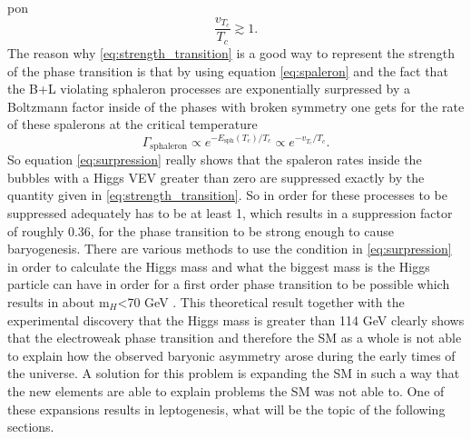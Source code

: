 pon\begin{equation}
	\frac{v_{T_c}}{T_c}\gtrsim1.
	\label{eq:strength_transition}
\end{equation}
The reason why \eqref{eq:strength_transition} is a good way to represent the strength of the phase transition is that by using equation \eqref{eq:spaleron} and the fact that the B+L violating sphaleron processes are exponentially surpressed by a Boltzmann factor inside of the phases with broken symmetry one gets for the rate of these spalerons at the critical temperature
\begin{equation}
	\Gamma_\text{sphaleron}\propto e^{-E_\text{sph}(T_c)/T_c}\propto e^{-v_{T_c}/T_c}.
	\label{eq:surpression}
\end{equation}
So equation \eqref{eq:surpression} really shows that the spaleron rates inside the bubbles with a Higgs VEV greater than zero are suppressed exactly by the quantity given in \eqref{eq:strength_transition}. So in order for these processes to be suppressed adequately has to be at least 1, which results in a suppression factor of roughly 0.36, for the phase transition to be strong enough to cause baryogenesis. \newline\indent 
There are various methods to use the condition in \eqref{eq:surpression} in order to calculate the Higgs mass and what the biggest mass is the Higgs particle can have in order for a first order phase transition to be possible which results in about m$_H$<70 GeV \cite[pp. 3f.]{Fodor:1999at}. \newline\indent
This theoretical result together with the experimental discovery that the Higgs mass is greater than 114 GeV \cite[pp. 100ff.]{Abbaneo:2001ix} clearly shows that the electroweak phase transition and therefore the SM as a whole is not able to explain how the observed baryonic asymmetry arose during the early times of the universe. \newline\indent
A solution for this problem is expanding the SM in such a way that the new elements are able to explain problems the SM was not able to. One of these expansions results in leptogenesis, what will be the topic of the following sections.